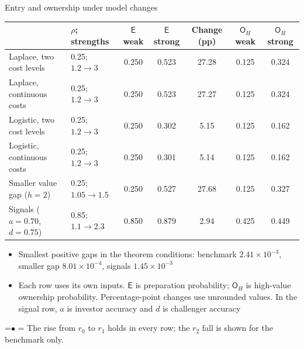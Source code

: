 \documentclass[10pt,aspectratio=169]{beamer}
\newcommand{\TakeawayBody}[1]{\begin{minipage}{\textwidth}\raggedright\normalsize
    \setbox0=\hbox{{\usebeamercolor[fg]{structure}\raise0.7pt\hbox{\scriptsize$\bullet$}}\hspace{0.55em}}%
    \hangindent=\wd0 \hangafter=1 \noindent\box0 #1\par
  \end{minipage}}
\renewcommand{\Takeaway}[2][\ExhibitReadingGap]{\par\vspace{#1}\noindent\TakeawayBody{#2}\par}
\newcommand{\NavGap}{\par\vspace{0.45cm}}%
\let\AdapterBackButton\BackButton
\renewcommand{\BackButton}[1]{\NavGap\AdapterBackButton{#1}}%
\begin{document}
\begin{frame}[label=A26]{Entry and ownership under model changes}
\hypertarget{app:robust}{}
\vspace{4pt}
\begin{center}\footnotesize
\setlength{\tabcolsep}{4.5pt}
\begin{tabular}{@{}llccccc@{}}
\toprule
 & $\rho$; strengths & $\mathsf E$ weak & $\mathsf E$ strong & Change (pp) & $\mathsf O_H$ weak & $\mathsf O_H$ strong\\
\midrule
Laplace, two cost levels & 0.25; $1.2\to3$ & 0.250 & 0.523 & 27.28 & 0.125 & 0.324\\ %
Laplace, continuous costs & 0.25; $1.2\to3$ & 0.250 & 0.523 & 27.27 & 0.125 & 0.324\\ %
Logistic, two cost levels & 0.25; $1.2\to3$ & 0.250 & 0.302 & 5.15 & 0.125 & 0.162\\ %
Logistic, continuous costs & 0.25; $1.2\to3$ & 0.250 & 0.301 & 5.14 & 0.125 & 0.162\\ %
Smaller value gap ($h=2$) & 0.25; $1.05\to1.5$ & 0.250 & 0.527 & 27.68 & 0.125 & 0.327\\ %
Signals ($a=0.70$, $d=0.75$) & 0.85; $1.1\to2.3$ & 0.850 & 0.879 & 2.94 & 0.425 & 0.449\\ %
\bottomrule
\end{tabular}
\end{center}
\vspace{-4pt}
{\small
\begin{itemize}\setlength{\itemsep}{2pt}
\item Smallest positive gaps in the theorem conditions: benchmark $2.41\times10^{-3}$, %
smaller gap $8.01\times10^{-4}$, %
signals $1.45\times10^{-3}$ %
\item Each row uses its own inputs. $\mathsf E$ is preparation probability; $\mathsf O_H$ is high-value ownership probability. Percentage-point changes use unrounded values. In the signal row, $a$ is investor accuracy and $d$ is challenger accuracy
\end{itemize}}
\Takeaway{The rise from $r_0$ to $r_1$ holds in every row; the $r_2$ fall is shown for the benchmark only.}
\end{frame}
\end{document}
